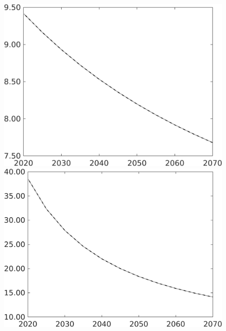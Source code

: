 \documentclass[12pt]{article}
\begin{document}
\begin{figure}[h!!]
\begin{minipage}[]{0.32\textwidth}
	\end{minipage}	
	\begin{minipage}[]{0.32\textwidth}
		\includegraphics[width=1\textwidth]{../../codding_model/own_basedOnFried/optimalPol_010922_revision/figures/all_13Sept22/CompTaul_LFBAU_Reg0_gAn_spillover0_nsk1_xgr0_knspil0_sep1_countec0_GovRev0_etaa0.79_lgd0.png}
	\end{minipage}	
	\begin{minipage}[]{0.32\textwidth}
		\includegraphics[width=1\textwidth]{../../codding_model/own_basedOnFried/optimalPol_010922_revision/figures/all_13Sept22/CompTaul_LFBAU_Reg0_gAg_spillover0_nsk1_xgr0_knspil0_sep1_countec0_GovRev0_etaa0.79_lgd0.png}

\end{minipage}
\end{figure}
\end{document}
